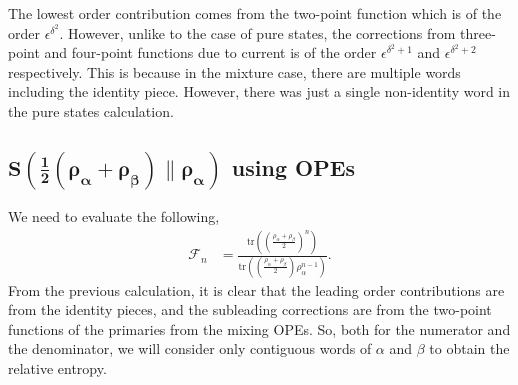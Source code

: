 \documentclass[11pt]{article}
\newcommand{\ep}{\epsilon}
\newcommand{\lb}{\left(}
\newcommand{\rb}{\right)}
\begin{document}
The lowest order contribution comes from the two-point function which is of the order $\ep^{\delta^2}$. However, unlike to the case of pure states, the corrections from three-point and four-point functions due to current is of the order $\ep^{\delta^2+1}$ and $\ep^{\delta^2+2}$ respectively. This is because in the mixture case, there are multiple words including the identity piece. However, there was just a single non-identity word in the pure states calculation.
\subsection{\texorpdfstring{$\boldsymbol{S\lb\frac{1}{2}\lb \rho_\alpha + \rho_\beta\rb  \| \rho_\alpha\rb }$ using OPEs}{S(half rho alpha plus half rho beta wrt half rho alpha) using OPEs}}
We need to evaluate the following,
\begin{align}
    \mathcal{F}_n &= \frac{\text{tr}\lb\lb \frac{ \rho_\alpha + \rho_\beta}{2}\rb^n\rb}{\text{tr}\lb \lb \frac{\rho_\alpha + \rho_\beta}{2}\rb \rho_\alpha^{n-1} \rb}.
\end{align}
From the previous calculation, it is clear that the leading order contributions are from the identity pieces, and the subleading corrections are from the two-point functions of the primaries from the mixing OPEs. So, both for the numerator and the denominator, we will consider only contiguous words of $\alpha$ and $\beta$ to obtain the relative entropy. 
\end{document}
